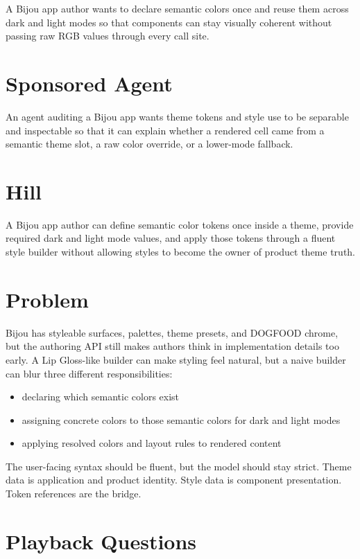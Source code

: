 A Bijou app author wants to declare semantic colors once and reuse them across dark and light modes so that components can stay visually coherent without passing raw RGB values through every call site.

\section{Sponsored Agent}\label{record-178-sponsored-agent}

An agent auditing a Bijou app wants theme tokens and style use to be separable and inspectable so that it can explain whether a rendered cell came from a semantic theme slot, a raw color override, or a lower-mode fallback.

\section{Hill}\label{record-178-hill}

A Bijou app author can define semantic color tokens once inside a theme, provide required dark and light mode values, and apply those tokens through a fluent style builder without allowing styles to become the owner of product theme truth.

\section{Problem}\label{record-178-problem}

Bijou has styleable surfaces, palettes, theme presets, and DOGFOOD chrome, but the authoring API still makes authors think in implementation details too early. A Lip Gloss-like builder can make styling feel natural, but a naive builder can blur three different responsibilities:

\begin{itemize}
\tightlist
\item
  declaring which semantic colors exist
\item
  assigning concrete colors to those semantic colors for dark and light modes
\item
  applying resolved colors and layout rules to rendered content
\end{itemize}

The user-facing syntax should be fluent, but the model should stay strict. Theme data is application and product identity. Style data is component presentation. Token references are the bridge.

\section{Playback Questions}\label{record-178-playback-questions}


